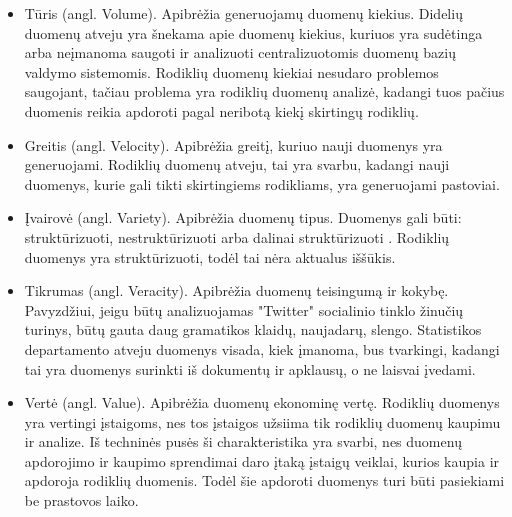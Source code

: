 \documentclass{VUMIFPSkursinis}
\begin{document}
\begin{itemize}
    \item Tūris (angl. Volume). Apibrėžia generuojamų duomenų kiekius. Didelių duomenų atveju yra šnekama apie duomenų kiekius, kuriuos yra sudėtinga arba neįmanoma saugoti 
    ir analizuoti centralizuotomis duomenų bazių valdymo sistemomis. Rodiklių duomenų kiekiai nesudaro problemos saugojant, tačiau problema yra rodiklių duomenų analizė, 
    kadangi tuos pačius duomenis reikia apdoroti pagal neribotą kiekį skirtingų rodiklių.
    \item Greitis (angl. Velocity). Apibrėžia greitį, kuriuo nauji duomenys yra generuojami. Rodiklių duomenų atveju, tai yra svarbu, kadangi nauji duomenys, kurie gali 
    tikti skirtingiems rodikliams, yra generuojami pastoviai.
    \item Įvairovė (angl. Variety). Apibrėžia duomenų tipus. Duomenys gali būti: struktūrizuoti, nestruktūrizuoti arba dalinai struktūrizuoti \cite{zikopoulos2011understanding}. 
    Rodiklių duomenys yra struktūrizuoti, todėl tai nėra aktualus iššūkis.
    \item Tikrumas (angl. Veracity). Apibrėžia duomenų teisingumą ir kokybę. Pavyzdžiui, jeigu būtų analizuojamas "Twitter" socialinio tinklo žinučių turinys, būtų gauta
    daug gramatikos klaidų, naujadarų, slengo. 
    Statistikos departamento atveju duomenys visada, kiek įmanoma, bus tvarkingi, kadangi tai yra duomenys surinkti iš dokumentų ir apklausų, o ne laisvai įvedami.
    \item Vertė (angl. Value). Apibrėžia duomenų ekonominę vertę. Rodiklių duomenys yra vertingi įstaigoms, nes tos įstaigos užsiima tik rodiklių duomenų kaupimu ir analize.
    Iš techninės pusės ši charakteristika yra svarbi, nes duomenų apdorojimo ir kaupimo sprendimai daro įtaką įstaigų veiklai, kurios kaupia ir apdoroja rodiklių duomenis. 
    Todėl šie apdoroti duomenys turi būti pasiekiami be prastovos laiko.
\end{itemize}\par
\end{document}
